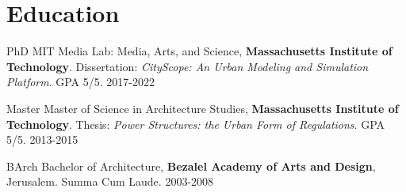 \section*{Education}

\begin{tablist}

    \item[PhD] \tab MIT Media Lab: Media, Arts, and Science, \textbf{Massachusetts Institute of Technology}. Dissertation: \textit{CityScope: An Urban Modeling and Simulation Platform}. GPA 5/5. 2017-2022
    \item[Master] \tab Master of Science in Architecture Studies, \textbf{Massachusetts Institute of Technology}. Thesis: \textit{Power Structures: the Urban Form of Regulations}. GPA 5/5. 2013-2015
    \item[BArch]  \tab Bachelor of Architecture, \textbf{Bezalel Academy of Arts and Design}, Jerusalem. Summa Cum Laude. 2003-2008

\end{tablist}

